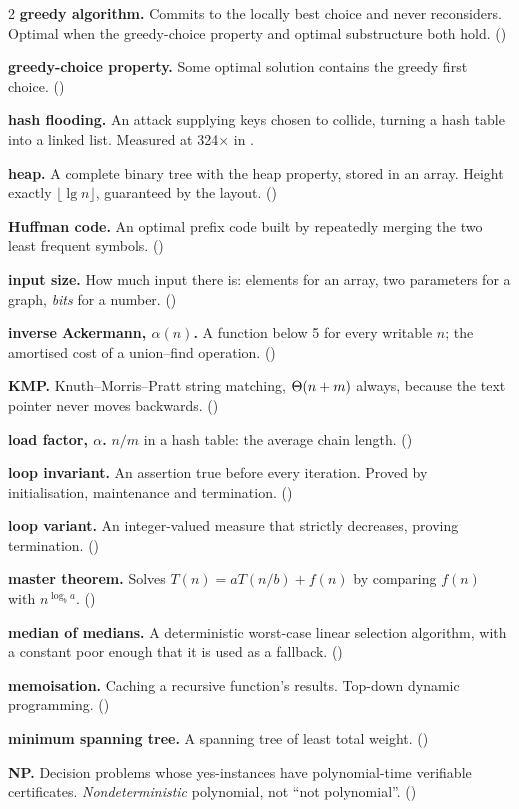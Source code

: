 \begin{multicols}{2}
\textbf{greedy algorithm.} Commits to the locally best choice and never
reconsiders. Optimal when the greedy-choice property and optimal substructure
both hold. ()

\textbf{greedy-choice property.} Some optimal solution contains the greedy
first choice. ()

\textbf{hash flooding.} An attack supplying keys chosen to collide, turning a
hash table into a linked list. Measured at 324$\times$ in .

\textbf{heap.} A complete binary tree with the heap property, stored in an
array. Height exactly $\lfloor\lg n\rfloor$, guaranteed by the layout.
()

\textbf{Huffman code.} An optimal prefix code built by repeatedly merging the
two least frequent symbols. ()

\textbf{input size.} How much input there is: elements for an array, two
parameters for a graph, \emph{bits} for a number. ()

\textbf{inverse Ackermann, $\alpha(n)$.} A function below 5 for every writable
$n$; the amortised cost of a union--find operation. ()

\textbf{KMP.} Knuth--Morris--Pratt string matching, $\Theta(n+m)$ always,
because the text pointer never moves backwards. ()

\textbf{load factor, $\alpha$.} $n/m$ in a hash table: the average chain
length. ()

\textbf{loop invariant.} An assertion true before every iteration. Proved by
initialisation, maintenance and termination. ()

\textbf{loop variant.} An integer-valued measure that strictly decreases,
proving termination. ()

\textbf{master theorem.} Solves $T(n) = aT(n/b)+f(n)$ by comparing $f(n)$ with
$n^{\log_{b}a}$. ()

\textbf{median of medians.} A deterministic worst-case linear selection
algorithm, with a constant poor enough that it is used as a fallback.
()

\textbf{memoisation.} Caching a recursive function's results. Top-down dynamic
programming. ()

\textbf{minimum spanning tree.} A spanning tree of least total weight.
()

\textbf{NP.} Decision problems whose yes-instances have polynomial-time
verifiable certificates. \emph{Nondeterministic} polynomial, not ``not
polynomial''. ()


\end{multicols}
